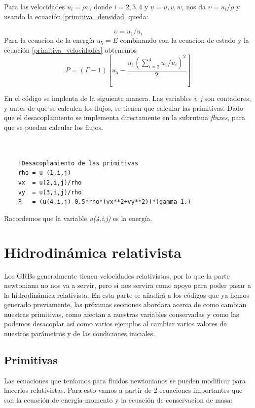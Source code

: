 \documentclass[12pt,a4paper]{book}
\begin{document}
Para las velocidades $u_i=\rho \upsilon$, donde $i=2,3,4$ y $\upsilon=u,v,w$, nos da $\upsilon= u_i/ \rho$ y usando la ecuación \ref{primitiva_densidad} queda:

\begin{equation} \label{primitiva_velocidades}
\upsilon = u_1/u_i
\end{equation}
Para la ecuacion de la energía $u_5=E$ combinando con la ecuacion de estado y la ecuación \ref{primitiva_velocidades} obtenemos
\begin{equation}
P = \left( \Gamma - 1 \right) \left[ u_5 - \frac{u_1 \left( \sum_{i=2}^{4} u_1/u_i \right)^2}{2} \right]
\end{equation}

En el código se implenta de la siguiente manera.
Las variables \emph{i}, \emph{j} son contadores, y antes de que se calculen los flujos, se tienen que calcular las primitivas. Dado que el desacoplamiento
se implementa directamente en la subrutina \emph{fluxes}, para que se puedan calcular los flujos.

\begin{lstlisting}[frame=single] 
  

    !Desacoplamiento de las primitivas
    rho = u (1,i,j)
    vx  = u(2,i,j)/rho
    vy  = u(3,i,j)/rho
    P   = (u(4,i,j)-0.5*rho*(vx**2+vy**2))*(gamma-1.)

\end{lstlisting}

Racordemos que la variable \emph{u(4,i,j)} es la energía.
  


\section{Hidrodinámica relativista}
Los GRBs generalmente tienen velocidades relativistas, por lo que la parte newtoniana no nos va a servir, pero si nos servira como apoyo para poder pasar
a la hidrodinámica relativista.
En esta parte se añadirá a los códigos que ya hemos generado previamente, las próximas secciones abordara acerca de como cambian nuestras primitivas,
como afectan a nuestras variables conservadas y como las podemos desacoplar así como varios ejemplos al cambiar varios valores de nuestros parámetros y 
de las condiciones iniciales.

\subsection{Primitivas}
Las ecuaciones que teníamos para fluidos newtonianos se pueden modificar para hacerlos relativistas. Para esto vamos a partir de 2 ecuaciones importantes que son la ecuación de energía-momento y la ecuación de conservacion de masa:
\end{document}

